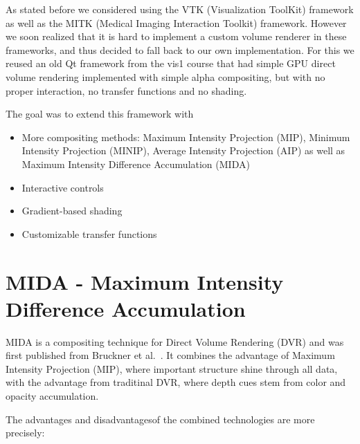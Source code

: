 As stated before we considered using the VTK (Visualization ToolKit) framework as well as the MITK (Medical Imaging Interaction Toolkit) framework. However we soon realized that it is hard to implement a custom volume renderer in these frameworks, and thus decided to fall back to our own implementation. For this we reused an old Qt framework from the vis1 course that had simple GPU direct volume rendering implemented with simple alpha compositing, but with no proper interaction, no transfer functions and no shading.

The goal was to extend this framework with
\begin{itemize}
	\item More compositing methods: Maximum Intensity Projection (MIP), Minimum Intensity Projection (MINIP), Average Intensity Projection (AIP) as well as Maximum Intensity Difference Accumulation (MIDA)
	\item Interactive controls
	\item Gradient-based shading
	\item Customizable transfer functions
\end{itemize}




\section{MIDA  - Maximum Intensity Difference Accumulation}

MIDA is a compositing technique for Direct Volume Rendering (DVR) and was first published from Bruckner et al.~\cite{bruckner2009instant}.
It combines the advantage of Maximum Intensity Projection (MIP), where important structure shine through all data, 
with the advantage from traditinal DVR, where depth cues stem from color and opacity accumulation.

The advantages and disadvantagesof the combined technologies are more precisely:

